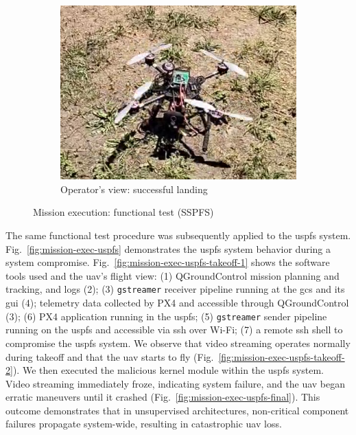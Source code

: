 \begin{figure}[!hbt]
\begin{subfigure}[t]{0.49\textwidth}
    \includegraphics[width=0.92\linewidth]{./img/png/bao-flight-myView-final}
    \caption{Operator's view: successful landing}%
    \label{fig:mission-exec-sspfs-final}
  \end{subfigure}
%  
  \caption{Mission execution: functional test (SSPFS)}
  \label{fig:mission-exec-sspfs-last}
\end{figure}

The same functional test procedure was subsequently applied to the \gls{uspfs}
system.
Fig.~\ref{fig:mission-exec-uspfs} demonstrates the \gls{uspfs} system behavior
during a system compromise. Fig.~\ref{fig:mission-exec-uspfs-takeoff-1} shows
the software tools used and the \gls{uav}'s flight view: (1) QGroundControl
mission planning and tracking, and logs (2); (3) \lstinline{gstreamer} receiver pipeline
running at the \gls{gcs} and its \gls{gui} (4); telemetry data collected by PX4
and accessible through QGroundControl (3); (6) PX4 application running in the
\gls{uspfs}; (5) \lstinline{gstreamer} sender pipeline
running on the \gls{uspfs} and accessible via
\gls{ssh} over Wi-Fi; (7) a remote \gls{ssh} shell to compromise the
\gls{uspfs} system. We observe that video streaming operates normally during
takeoff and that the \gls{uav} starts to fly (Fig.~\ref{fig:mission-exec-uspfs-takeoff-2}).
We then executed the malicious kernel module within the \gls{uspfs}
system. Video streaming immediately froze, indicating system failure,
and the \gls{uav} began erratic maneuvers until it crashed
(Fig.~\ref{fig:mission-exec-uspfs-final}).
%
This outcome demonstrates that in unsupervised architectures, non-critical
component failures propagate system-wide, resulting in catastrophic \gls{uav}
loss.

